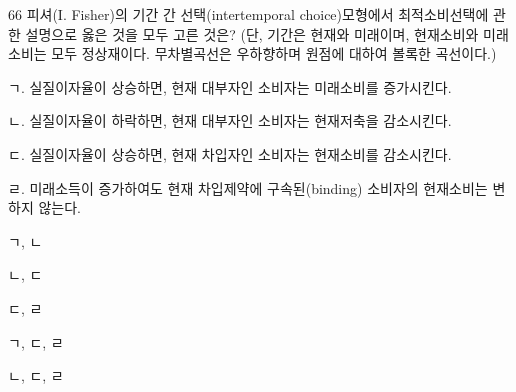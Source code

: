 \begin{question}{66}
피셔(I. Fisher)의 기간 간 선택(intertemporal choice)모형에서 최적소비선택에 관한 설명으로 옳은 것을 모두 고른 것은? (단, 기간은 현재와 미래이며, 현재소비와 미래소비는 모두 정상재이다. 무차별곡선은 우하향하며 원점에 대하여 볼록한 곡선이다.)
\begin{framedtext}
ㄱ. 실질이자율이 상승하면, 현재 대부자인 소비자는 미래소비를 증가시킨다. \par
ㄴ. 실질이자율이 하락하면, 현재 대부자인 소비자는 현재저축을 감소시킨다. \par
ㄷ. 실질이자율이 상승하면, 현재 차입자인 소비자는 현재소비를 감소시킨다. \par
ㄹ. 미래소득이 증가하여도 현재 차입제약에 구속된(binding) 소비자의 현재소비는 변하지 않는다.
\end{framedtext}
\begin{choices}
  \item ㄱ, ㄴ
  \item ㄴ, ㄷ
  \item ㄷ, ㄹ
  \item ㄱ, ㄷ, ㄹ
  \item ㄴ, ㄷ, ㄹ
\end{choices}
\end{question}
